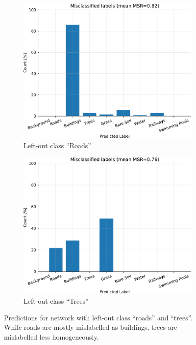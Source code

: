 \documentclass[10pt]{article}
\begin{document}
\begin{figure}[H]
    \begin{subfigure}{.49\textwidth}
        \centering
        \includegraphics[width=\textwidth]{ZH_pred-count_wo_cl1}
        \caption{Left-out class ``Roads''}
    \end{subfigure}
    \begin{subfigure}{.5\textwidth}
        \centering
        \includegraphics[width=\textwidth]{ZH_pred-count_wo_cl3}
        \caption{Left-out class ``Trees''}
    \end{subfigure}
    \caption{Predictions for network with left-out class ``roads'' and ``trees''. While roads are mostly mislabelled as buildings, trees are mislabelled less homogeneously.}
    \label{fig:pred-count-zurich}
\end{figure} 
\end{document}

